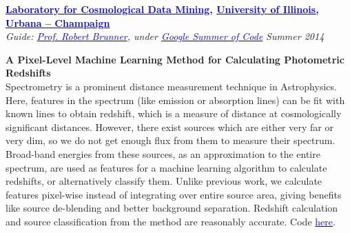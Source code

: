 \documentclass[margin,line]{res}
\newenvironment{list1}{
  \begin{list}{\ding{113}}{%
      \setlength{\itemsep}{0in}
      \setlength{\parsep}{0in} \setlength{\parskip}{0in}
      \setlength{\topsep}{0in} \setlength{\partopsep}{0in} 
      \setlength{\leftmargin}{0.17in}}}{\end{list}}
\begin{document}
\begin{resume}
{\bf \href{http://lcdm.astro.illinois.edu/}{\textcolor{blue} {Laboratory for Cosmological Data Mining}}, \href{http://www.illinois.edu/}{\textcolor{blue}{University of Illinois, Urbana -- Champaign}}} \\
{\em Guide: \href{http://www.astro.illinois.edu/people/bigdog}{\textcolor{blue}{Prof. Robert Brunner}}, under \href{https://www.google-melange.com/gsoc/homepage/google/gsoc2014}{\textcolor{blue} {Google Summer of Code}}} \hfill {\it Summer 2014} \\
\vspace*{-.13in}
\begin{list1}
\item[]\textbf{A Pixel-Level Machine Learning Method for Calculating Photometric Redshifts} \\
Spectrometry is a prominent distance measurement technique in Astrophysics. Here, features in
the spectrum (like emission or absorption lines) can be fit with known lines to obtain redshift,
which is a measure of distance at cosmologically significant distances. However, there exist sources which are either very far or very dim, so we do not get enough flux from them to measure their spectrum. Broad-band energies from these sources, as an approximation to the entire spectrum, are used as features for a machine learning algorithm to calculate redshifts, or alternatively classify them. Unlike previous work, we calculate features pixel-wise instead of integrating over entire source area, giving benefits like source de-blending and better background separation. Redshift calculation and source classification from the method are reasonably accurate. Code \href{https://github.com/alankarkotwal/image-photo-z/}{\textcolor{blue} {here}}.
\end{list1}


\end{resume}
\end{document}
